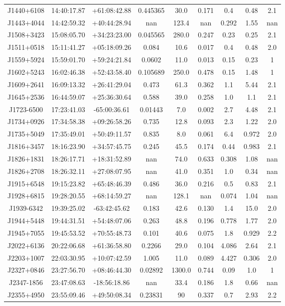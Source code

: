 \begin{table}
\begin{tabular}{@{}ccccccccc@{}}
        J1440+6108 & 14:40:17.87 & +61:08:42.88 & 0.445365 & 30.0 & 0.171 & 0.4 & 0.48 & 2.1 \\
        J1443+4044 & 14:42:59.32 & +40:44:28.94 & nan & 123.4 & nan & 0.292 & 1.55 & nan \\
        J1508+3423 & 15:08:05.70 & +34:23:23.00 & 0.045565 & 280.0 & 0.247 & 0.23 & 0.25 & 2.1 \\
        J1511+0518 & 15:11:41.27 & +05:18:09.26 & 0.084 & 10.6 & 0.017 & 0.4 & 0.48 & 2.0 \\
        J1559+5924 & 15:59:01.70 & +59:24:21.84 & 0.0602 & 11.0 & 0.013 & 0.15 & 0.23 & 1 \\
        J1602+5243 & 16:02:46.38 & +52:43:58.40 & 0.105689 & 250.0 & 0.478 & 0.15 & 1.48 & 1 \\
        J1609+2641 & 16:09:13.32 & +26:41:29.04 & 0.473 & 61.3 & 0.362 & 1.1 & 5.44 & 2.1 \\
        J1645+2536 & 16:44:59.07 & +25:36:30.64 & 0.588 & 39.0 & 0.258 & 1.0 & 1.1 & 2.1 \\
        J1723-6500 & 17:23:41.03 & -65:00:36.61 & 0.01443 & 7.0 & 0.002 & 2.7 & 4.48 & 2.1 \\
        J1734+0926 & 17:34:58.38 & +09:26:58.26 & 0.735 & 12.8 & 0.093 & 2.3 & 1.22 & 2.0 \\
        J1735+5049 & 17:35:49.01 & +50:49:11.57 & 0.835 & 8.0 & 0.061 & 6.4 & 0.972 & 2.0 \\
        J1816+3457 & 18:16:23.90 & +34:57:45.75 & 0.245 & 45.5 & 0.174 & 0.44 & 0.983 & 2.1 \\
        J1826+1831 & 18:26:17.71 & +18:31:52.89 & nan & 74.0 & 0.633 & 0.308 & 1.08 & nan \\
        J1826+2708 & 18:26:32.11 & +27:08:07.95 & nan & 41.0 & 0.351 & 1.0 & 0.34 & nan \\
        J1915+6548 & 19:15:23.82 & +65:48:46.39 & 0.486 & 36.0 & 0.216 & 0.5 & 0.83 & 2.1 \\
        J1928+6815 & 19:28:20.55 & +68:14:59.27 & nan & 128.1 & nan & 0.074 & 1.04 & nan \\
        J1939-6342 & 19:39:25.02 & -63:42:45.62 & 0.183 & 42.6 & 0.130 & 1.4 & 15.0 & 2.0 \\
        J1944+5448 & 19:44:31.51 & +54:48:07.06 & 0.263 & 48.8 & 0.196 & 0.778 & 1.77 & 2.0 \\
        J1945+7055 & 19:45:53.52 & +70:55:48.73 & 0.101 & 40.6 & 0.075 & 1.8 & 0.929 & 2.2 \\
        J2022+6136 & 20:22:06.68 & +61:36:58.80 & 0.2266 & 29.0 & 0.104 & 4.086 & 2.64 & 2.1 \\
        J2203+1007 & 22:03:30.95 & +10:07:42.59 & 1.005 & 11.0 & 0.089 & 4.427 & 0.306 & 2.0 \\
        J2327+0846 & 23:27:56.70 & +08:46:44.30 & 0.02892 & 1300.0 & 0.744 & 0.09 & 1.0 & 1 \\
        J2347-1856 & 23:47:08.63 & -18:56:18.86 & nan & 33.4 & 0.186 & 1.8 & 0.66 & nan \\
        J2355+4950 & 23:55:09.46 & +49:50:08.34 & 0.23831 & 90 & 0.337 & 0.7 & 2.93 & 2.2 \\
        \bottomrule


\end{tabular}
\end{table}
